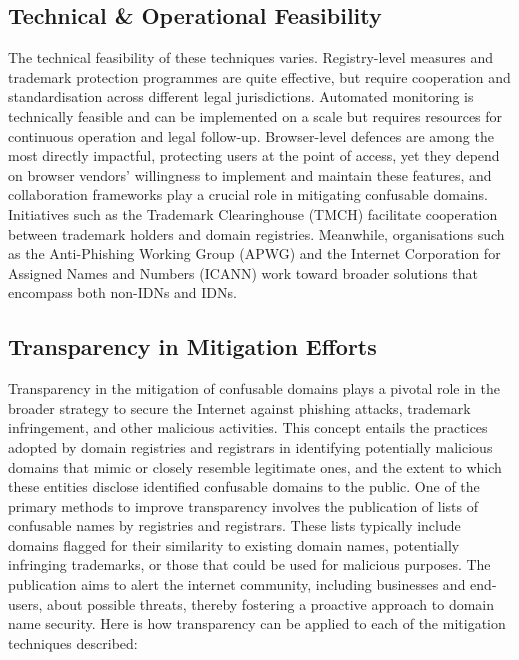 \subsection{Technical \& Operational Feasibility}
The technical feasibility of these techniques varies. Registry-level measures and trademark protection programmes are quite effective, but require cooperation and standardisation across different legal jurisdictions. Automated monitoring is technically feasible and can be implemented on a scale but requires resources for continuous operation and legal follow-up. Browser-level defences are among the most directly impactful, protecting users at the point of access, yet they depend on browser vendors' willingness to implement and maintain these features, and collaboration frameworks play a crucial role in mitigating confusable domains. Initiatives such as the Trademark Clearinghouse (TMCH) facilitate cooperation between trademark holders and domain registries. Meanwhile, organisations such as the Anti-Phishing Working Group (APWG) and the Internet Corporation for Assigned Names and Numbers (ICANN) work toward broader solutions that encompass both non-IDNs and IDNs.

\subsection{ Transparency in Mitigation Efforts}

Transparency in the mitigation of confusable domains plays a pivotal role in the broader strategy to secure the Internet against phishing attacks, trademark infringement, and other malicious activities. This concept entails the practices adopted by domain registries and registrars in identifying potentially malicious domains that mimic or closely resemble legitimate ones, and the extent to which these entities disclose identified confusable domains to the public. One of the primary methods to improve transparency involves the publication of lists of confusable names by registries and registrars. These lists typically include domains flagged for their similarity to existing domain names, potentially infringing trademarks, or those that could be used for malicious purposes. The publication aims to alert the internet community, including businesses and end-users, about possible threats, thereby fostering a proactive approach to domain name security. Here is how transparency can be applied to each of the mitigation techniques described:

